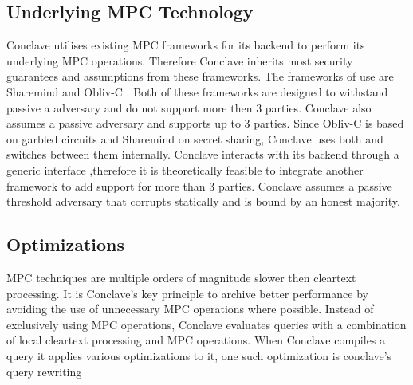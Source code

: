 \subsection{Underlying MPC Technology}
Conclave utilises existing MPC frameworks for its backend to perform its underlying MPC operations. Therefore Conclave inherits most security guarantees and assumptions from these frameworks. The frameworks of use are Sharemind \cite{bogdanov2008sharemind} and Obliv-C \cite{zahur2015obliv}. Both of these frameworks are designed to withstand passive a adversary and do not support more then 3 parties. Conclave also assumes a passive adversary and supports up to 3 parties.
Since Obliv-C is based on garbled circuits and Sharemind on secret sharing, Conclave uses both and switches between them internally. Conclave interacts with its backend through a generic interface ,therefore it is theoretically feasible to integrate another framework to add support for more than 3 parties. Conclave assumes a passive threshold adversary that corrupts statically and is bound by an honest majority.




\subsection{Optimizations}
MPC techniques are multiple orders of magnitude slower then cleartext processing. It is Conclave's key principle to archive better performance by avoiding the use of unnecessary MPC operations where possible. Instead of exclusively using MPC operations, Conclave evaluates queries with a combination of local cleartext processing and MPC operations. When Conclave compiles a query it applies various optimizations to it, one such optimization is conclave's query rewriting 
